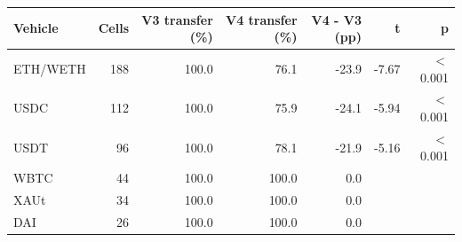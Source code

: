 \begin{tabular}{lrrrrrr}
\toprule
Vehicle & Cells & V3 transfer (\%) & V4 transfer (\%) & V4 - V3 (pp) & t & p \\
\midrule
ETH/WETH & 188 & 100.0 & 76.1 & -23.9 & -7.67 & \ensuremath{<}0.001 \\
USDC & 112 & 100.0 & 75.9 & -24.1 & -5.94 & \ensuremath{<}0.001 \\
USDT & 96 & 100.0 & 78.1 & -21.9 & -5.16 & \ensuremath{<}0.001 \\
WBTC & 44 & 100.0 & 100.0 & 0.0 &  &  \\
XAUt & 34 & 100.0 & 100.0 & 0.0 &  &  \\
DAI & 26 & 100.0 & 100.0 & 0.0 &  &  \\
\bottomrule
\end{tabular}
